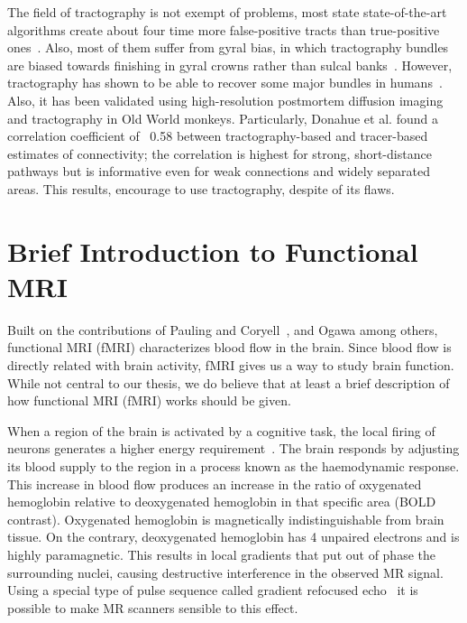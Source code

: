 The field of tractography is not exempt of problems, most state state-of-the-art
algorithms create about four time more false-positive tracts than true-positive
ones~\cite{Maier-hein2017}. Also, most of them suffer from gyral bias, in which tractography bundles
are biased towards finishing in gyral crowns rather than sulcal banks~\cite{VanEssen2014}.
However, tractography has shown to be able to recover some major
bundles in humans~\cite{Catani2008}. Also, it has been validated using high-resolution
postmortem diffusion imaging and tractography in Old World monkeys. Particularly,
Donahue et al.\cite{Donahue2016} found a correlation
coefficient of ~0.58 between tractography-based and tracer-based estimates of
connectivity; the correlation is highest for strong, short-distance pathways
but is informative even for weak connections and widely separated areas. This
results, encourage to use tractography, despite of its flaws.

\section{Brief Introduction to Functional MRI}

Built on the contributions of Pauling and Coryell~\cite{Pauling1936}, and 
Ogawa\cite{Ogawa1990, Ogawa1993} among others, functional MRI (fMRI) characterizes
blood flow in the brain. Since blood flow is directly related with brain
activity, fMRI gives us a way to study brain function. While not central to our
thesis, we do believe that at least a brief description of how functional MRI
(fMRI) works should be given.

When a region of the brain is activated by a cognitive task, the local firing
of neurons generates a higher energy requirement~\cite{Glover2011}.
The brain responds by adjusting its blood supply to the region in a process
known as the haemodynamic response. This increase in blood flow produces an
increase in the ratio of oxygenated hemoglobin relative to deoxygenated hemoglobin
in that specific area (BOLD contrast). Oxygenated hemoglobin is magnetically 
indistinguishable from brain tissue. On the contrary, deoxygenated hemoglobin
has 4 unpaired electrons and is highly paramagnetic\cite{Glover2011}. This
results in local gradients that put out of phase the surrounding nuclei, causing destructive
interference in the observed MR signal. Using a special type of pulse sequence
called gradient refocused echo~\cite{Elster1993} it is possible to make MR
scanners sensible to this effect.

